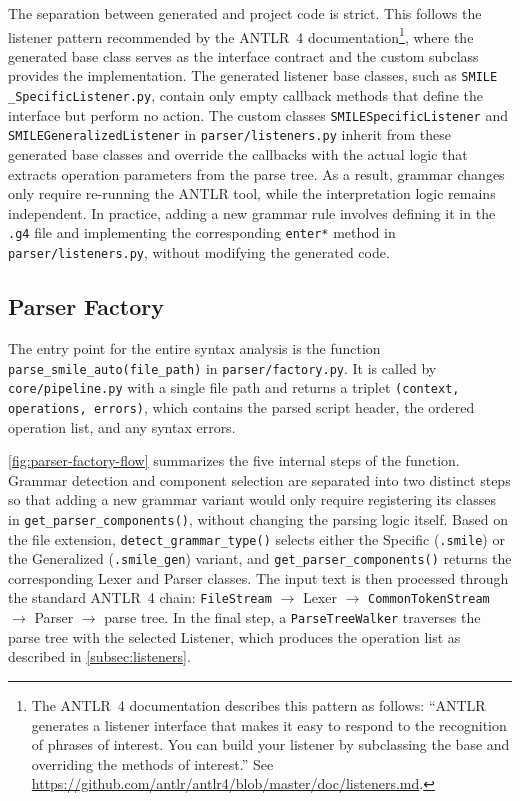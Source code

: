 The separation between generated and project code is strict. This follows the listener pattern recommended by the ANTLR~4 documentation\footnote{The ANTLR~4
  documentation describes this pattern as follows: ``ANTLR generates a listener interface that makes it easy to respond to the recognition of phrases of interest. You
  can build your listener by subclassing the base and overriding the methods of interest.'' See \url{https://github.com/antlr/antlr4/blob/master/doc/listeners.md}.},
  where the generated base class serves as the interface contract and the custom subclass provides the implementation. The generated listener base classes, such as
  \texttt{SMILE \_SpecificListener.py}, contain only empty callback methods that define the interface but perform no action. The custom classes
  \texttt{SMILESpecificListener} and \texttt{SMILEGeneralizedListener} in \texttt{parser/listeners.py} inherit from these generated base classes and override the callbacks with the actual logic that extracts operation parameters from the parse tree. As a result, grammar changes only require re-running the ANTLR tool, while the
  interpretation logic remains independent. In practice, adding a new grammar rule involves defining it in the \texttt{.g4} file and implementing the corresponding
  \texttt{enter*} method in \texttt{parser/listeners.py}, without modifying the generated code.

  \subsection{Parser Factory}\label{subsec:parser-factory}
The entry point for the entire syntax analysis is the function \texttt{parse\_smile\_auto(file\_path)} in \texttt{parser/factory.py}. It is called by \texttt{core/pipeline.py}
  with a single file path and returns a triplet \texttt{(context, operations, errors)}, which contains the parsed script header, the ordered operation list, and any
  syntax errors.

\autoref{fig:parser-factory-flow} summarizes the five internal steps of the function. Grammar detection and component selection are separated into two distinct steps
  so that adding a new grammar variant would only require registering its classes in \texttt{get\_parser\_components()}, without changing the parsing logic itself. Based on the file extension, \texttt{detect\_grammar\_type()} selects either the Specific (\texttt{.smile}) or the Generalized (\texttt{.smile\_gen}) variant, and
  \texttt{get\_parser\_components()} returns the corresponding Lexer and Parser classes. The input text is then processed through the standard ANTLR~4 chain:
  \texttt{FileStream} $\to$ Lexer $\to$ \texttt{CommonTokenStream} $\to$ Parser $\to$ parse tree. In the final step, a \texttt{ParseTreeWalker} traverses the parse tree
  with the selected Listener, which produces the operation list as described in \autoref{subsec:listeners}.


